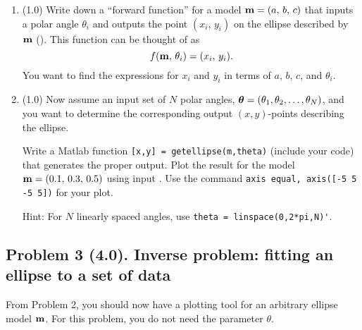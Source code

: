 \documentclass[11pt,titlepage,fleqn]{article}
\begin{document}
\begin{enumerate}
\item (1.0) Write down a ``forward function'' for a model $\mbox{${\bf m}$} = (a,\,b,\,c)$ that inputs a polar angle $\theta_i$ and outputs the point $(x_i,\,y_i)$ on the ellipse described by $\mbox{${\bf m}$}$ (). This function can be thought of as
%
\begin{equation}
f(\mbox{${\bf m}$},\,\theta_i) = (x_i,\,y_i).
\end{equation}
%
You want to find the expressions for $x_i$ and $y_i$ in terms of $a$, $b$, $c$, and $\theta_i$.

\item (1.0) Now assume an input set of $N$ polar angles, $\mbox{\boldmath $\bf \theta$} = (\theta_1, \theta_2, \ldots, \theta_N)$, and you want to determine the corresponding output $(x,y)$-points describing the ellipse.

Write a Matlab function \verb+[x,y] = getellipse(m,theta)+ (include your code) that generates the proper output. Plot the result for the model $\mbox{${\bf m}$} = (0.1,\,0.3,\,0.5)$ using input . Use the command \verb+axis equal, axis([-5 5 -5 5])+ for your plot.

Hint: For $N$ linearly spaced angles, use \verb+theta = linspace(0,2*pi,N)'+.

\end{enumerate}


\subsection*{Problem 3 (4.0). Inverse problem: fitting an ellipse to a set of data}

From Problem 2, you should now have a plotting tool for an arbitrary ellipse model $\mbox{${\bf m}$}$.
For this problem, you do not need the parameter $\theta$.
\end{document}
